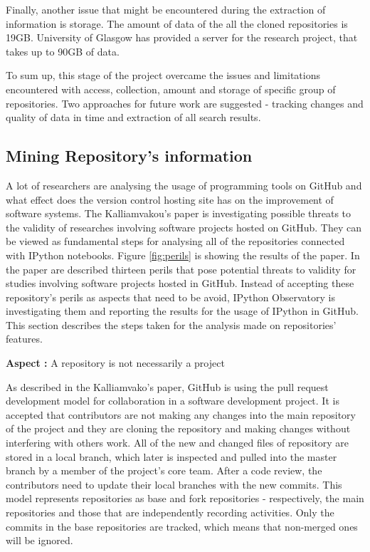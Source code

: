 Finally, another issue that might be encountered during the extraction of information is storage. The amount of data of the all the cloned repositories is 19GB. University of Glasgow has provided a server for the research project, that takes up to 90GB of data. 

To sum up, this stage of the project overcame the issues and limitations encountered with access, collection, amount and storage of specific group of repositories. Two approaches for future work are suggested - tracking changes and quality of data in time and extraction of all search results.

\subsection{Mining Repository's information}
\label{subsec:mining}

A lot of researchers are analysing the usage of programming tools on GitHub and what effect does the version control hosting site has on the improvement of software systems. The Kalliamvakou's paper \cite{kalliamvakoupromises} is investigating possible threats to the validity of researches involving software projects hosted on GitHub. They can be viewed as fundamental steps for analysing all of the repositories connected with IPython notebooks. Figure \ref{fig:perils} is showing the results of the paper. In the paper are described thirteen perils that pose potential threats to validity for studies involving software projects hosted in GitHub. Instead of accepting these repository's perils as aspects that need to be avoid, IPython Observatory is investigating them and reporting the results for the usage of IPython in GitHub. This section describes the steps taken for the analysis made on repositories' features.

\vspace{5mm}
\begin{mdframed}
\vspace{1px}
\textbf{Aspect :}  A repository is not necessarily a project
\vspace{1px}
\end{mdframed}
\vspace{2mm}

As described in the Kalliamvako's paper\cite{kalliamvakoupromises}, GitHub is using the pull request development model for collaboration in a software development project. It is accepted that contributors are not making any changes into the main repository of the project and they are cloning the repository and making changes without interfering with others work. All of the new and changed files of repository are stored in a local branch, which later is inspected and pulled into the master branch by a member of the project's core team. After a code review, the contributors need to update their local branches with the new commits. This model represents repositories as base and fork repositories - respectively, the main repositories and those that are independently recording activities. Only the commits in the base repositories are tracked, which means that non-merged ones will be ignored.


